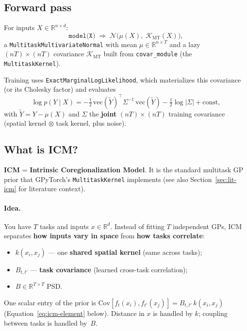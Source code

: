\documentclass[11pt]{article}
\theoremstyle{plain}
\newcommand{\Sig}{\Sigma}
\begin{document}
\subsection{Forward pass}

For inputs $X \in \mathbb{R}^{n \times d}$:
\begin{equation}
  \texttt{model(X)} \;\Rightarrow\;
  \mathcal{N}\bigl(\mu(X),\; \mathcal{K}_{\mathrm{MT}}(X)\bigr),
\end{equation}
a \texttt{MultitaskMultivariateNormal} with mean $\mu \in \mathbb{R}^{n \times T}$ and
a lazy $(nT) \times (nT)$ covariance $\mathcal{K}_{\mathrm{MT}}$ built from
\texttt{covar\_module} (the \texttt{MultitaskKernel}).

Training uses \texttt{ExactMarginalLogLikelihood}, which materializes this covariance
(or its Cholesky factor) and evaluates
\begin{equation}
  \log p(Y \mid X)
  = -\tfrac{1}{2}\,\mathrm{vec}(\tilde{Y})^\top \Sig^{-1}\,\mathrm{vec}(\tilde{Y})
  - \tfrac{1}{2}\log|\Sig| + \mathrm{const},
\end{equation}
with $\tilde{Y} = Y - \mu(X)$ and $\Sig$ the \textbf{joint} $(nT)\times(nT)$ training covariance
(spatial kernel $\otimes$ task kernel, plus noise).

\subsection{What is ICM?}
\label{sec:what-is-icm}

\textbf{ICM} = \textbf{Intrinsic Coregionalization Model}.
It is the standard multitask GP prior that GPyTorch's \texttt{MultitaskKernel} implements
(see also Section~\ref{sec:lit-icm} for literature context).

\paragraph{Idea.}
You have $T$ tasks and inputs $x \in \mathbb{R}^d$.
Instead of fitting $T$ independent GPs, ICM separates \textbf{how inputs vary in space} from
\textbf{how tasks correlate}:
\begin{itemize}[nosep]
  \item $k(x_i,x_j)$ --- one \textbf{shared spatial kernel} (same across tasks);
  \item $B_{t,t'}$ --- \textbf{task covariance} (learned cross-task correlation);
  \item $B \in \mathbb{R}^{T \times T}$ PSD.
\end{itemize}
One scalar entry of the prior is
$\mathrm{Cov}[f_t(x_i), f_{t'}(x_j)] = B_{t,t'}\, k(x_i,x_j)$
(Equation~\eqref{eq:icm-element} below).
Distance in $x$ is handled by $k$; coupling between tasks is handled by~$B$.
\end{document}
